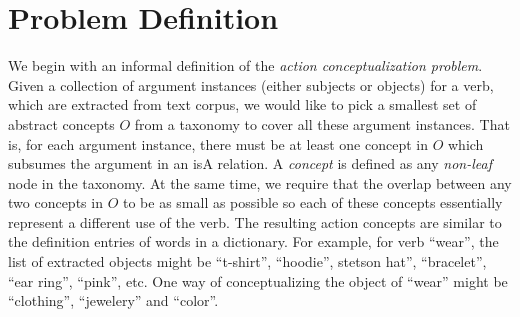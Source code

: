 \section{Problem Definition}
\label{sec:problem}

We begin with an informal definition of the
{\em action conceptualization problem}.
Given a collection of argument instances (either subjects or objects) for a
verb, which are extracted from text corpus, we would like to pick
a smallest set of abstract concepts $O$ from a taxonomy to cover all these
argument instances. That is, for each argument instance,
there must be at least one concept in $O$ which subsumes the argument
in an isA relation. A {\em concept} is defined as any {\em non-leaf} node
in the taxonomy.
At the same time, we require that the overlap between any two concepts in
$O$ to be as small as possible so each of these concepts essentially
represent a different use of the verb.
The resulting action concepts are similar to the definition entries of
words in a dictionary.
For example, for verb ``wear'', the list of extracted
objects might be ``t-shirt'', ``hoodie'', stetson hat'', ``bracelet'',
``ear ring'', ``pink'', etc. One way of conceptualizing the object of
``wear'' might be ``clothing'', ``jewelery'' and ``color''.
%
%

